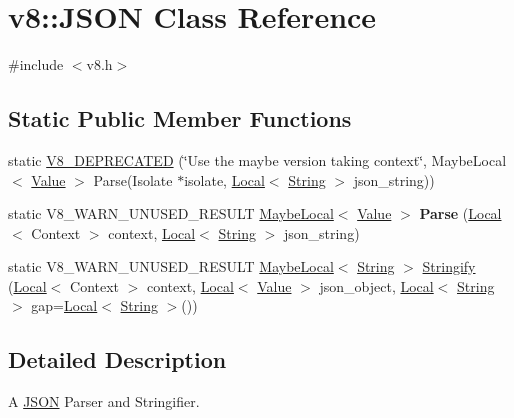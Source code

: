 \hypertarget{classv8_1_1JSON}{}\section{v8\+:\+:J\+S\+ON Class Reference}
\label{classv8_1_1JSON}


{\ttfamily \#include $<$v8.\+h$>$}

\subsection*{Static Public Member Functions}
\begin{DoxyCompactItemize}
\item 
static \mbox{\hyperlink{classv8_1_1JSON_acc5421b3e5d85d3788a1e6cb59403393}{V8\+\_\+\+D\+E\+P\+R\+E\+C\+A\+T\+ED}} (\char`\"{}Use the maybe version taking context\char`\"{}, Maybe\+Local$<$ \mbox{\hyperlink{classv8_1_1Value}{Value}} $>$ Parse(Isolate $\ast$isolate, \mbox{\hyperlink{classv8_1_1Local}{Local}}$<$ \mbox{\hyperlink{classv8_1_1String}{String}} $>$ json\+\_\+string))
\item 
\mbox{\label{classv8_1_1JSON_acd9320e365e9ac941c761c3e4b3e209d}} 
static V8\+\_\+\+W\+A\+R\+N\+\_\+\+U\+N\+U\+S\+E\+D\+\_\+\+R\+E\+S\+U\+LT \mbox{\hyperlink{classv8_1_1MaybeLocal}{Maybe\+Local}}$<$ \mbox{\hyperlink{classv8_1_1Value}{Value}} $>$ {\bfseries Parse} (\mbox{\hyperlink{classv8_1_1Local}{Local}}$<$ Context $>$ context, \mbox{\hyperlink{classv8_1_1Local}{Local}}$<$ \mbox{\hyperlink{classv8_1_1String}{String}} $>$ json\+\_\+string)
\item 
static V8\+\_\+\+W\+A\+R\+N\+\_\+\+U\+N\+U\+S\+E\+D\+\_\+\+R\+E\+S\+U\+LT \mbox{\hyperlink{classv8_1_1MaybeLocal}{Maybe\+Local}}$<$ \mbox{\hyperlink{classv8_1_1String}{String}} $>$ \mbox{\hyperlink{classv8_1_1JSON_ac5ddb9edc1369a7d889b7ac8411e7b71}{Stringify}} (\mbox{\hyperlink{classv8_1_1Local}{Local}}$<$ Context $>$ context, \mbox{\hyperlink{classv8_1_1Local}{Local}}$<$ \mbox{\hyperlink{classv8_1_1Value}{Value}} $>$ json\+\_\+object, \mbox{\hyperlink{classv8_1_1Local}{Local}}$<$ \mbox{\hyperlink{classv8_1_1String}{String}} $>$ gap=\mbox{\hyperlink{classv8_1_1Local}{Local}}$<$ \mbox{\hyperlink{classv8_1_1String}{String}} $>$())
\end{DoxyCompactItemize}


\subsection{Detailed Description}
A \mbox{\hyperlink{classv8_1_1JSON}{J\+S\+ON}} Parser and Stringifier. 

